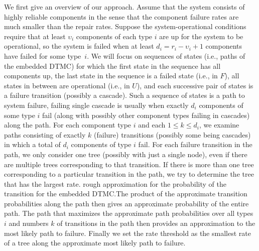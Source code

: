 \documentclass[12pt]{article}
\newcommand{\changed}[1]{#1}
\newcommand{\changed}[1]{\textcolor{red}{#1}}
\begin{document}
\changed{We first give an overview
of our approach.} Assume that the system consists of highly reliable
components
\cite{GSHNG:1992}
in the sense that the component failure rates are much smaller than the repair
rates. Suppose the system-operational conditions require that at least
$\upsilon_i$ components of each type $i$ are up for the system to be
operational, %
\changed{so the system is failed
when at least $d_i = r_i - \upsilon_i + 1$ components have failed for some
type~$i$. We will focus on sequences of states (i.e., paths of the embedded
DTMC) for which the first state in the sequence has all components up, the
last state in the sequence is a failed state (i.e., in $F$), all states in
between are operational (i.e., in $U$), and each successive pair of states is
a failure transition (possibly a cascade). Such a sequence of states is a path
to system failure, %
failing %
single cascade is usually when exactly $d_i$ components of some type $i$ fail
(along with possibly other component types failing in cascades) along the
path. For each component type $i$ and each $1 \leq k \leq d_i$, we examine
paths consisting of exactly $k$ (failure) transitions (possibly some being
cascades) in which a total of $d_i$ components of type $i$ fail. For each
failure transition in the path, we only consider one tree (possibly with just
a single node), even if there are multiple trees corresponding to that
transition.  If there is more than one tree corresponding to a particular
transition in the path, we try to determine the tree that has the largest
rate. %
rough approximation for the probability of the transition for the embedded
DTMC.\@ The product of the approximate transition probabilities along the path
then gives an approximate probability of the entire path. The path that
maximizes the approximate path probabilities over all types $i$ and numbers
$k$ of transitions in the path then provides an approximation to the most
likely path to failure. Finally we set the rate threshold as the smallest rate
of a tree along the approximate most likely path to failure.}
\end{document}
